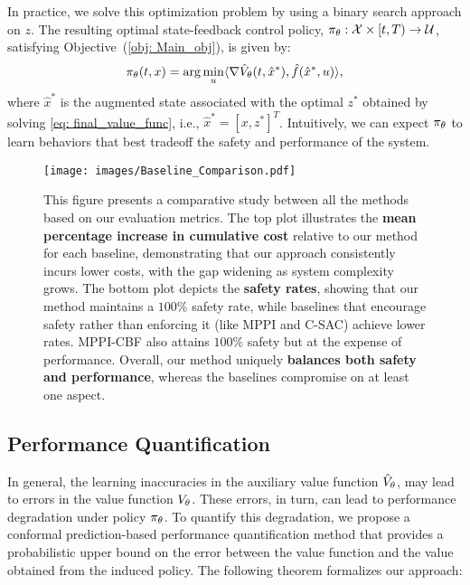 In practice, we solve this optimization problem by using a binary search approach on $z$. The resulting optimal state-feedback control policy, $\pi_{\theta}: \mathcal{X} \times [t, T) \to \mathcal{U}$, satisfying Objective~(\ref{obj: Main_obj}), is given by:
\begin{equation} \label{eq: optimal_pi}
    \pi_{\theta}(t, x) = \arg \min _u \langle\nabla \hat{V}_{\theta}(t, \hat{x}^*), \hat{f}(\hat{x}^*, u)\rangle,
\end{equation}
where $\hat{x}^*$ is the augmented state associated with the optimal $z^*$ obtained by solving \eqref{eq: final_value_func}, i.e., $\hat{x}^* = [x, z^*]^T$.
Intuitively, we can expect $\pi_{\theta}$ to learn behaviors that best tradeoff the safety and performance of the system.
\begin{figure*}[t]
    \centering
    \texttt{[image: images/Baseline\_Comparison.pdf]}
    \vspace{-0.5em}
\caption{This figure presents a comparative study between all the methods based on our evaluation metrics. The top plot illustrates the \textbf{mean percentage increase in cumulative cost} relative to our method for each baseline, demonstrating that our approach consistently incurs lower costs, with the gap widening as system complexity grows. The bottom plot depicts the \textbf{safety rates}, showing that our method maintains a $100\%$ safety rate, while baselines that encourage safety rather than enforcing it (like MPPI and C-SAC) achieve lower rates. MPPI-CBF also attains $100\%$ safety but at the expense of performance. Overall, our method uniquely \textbf{balances both safety and performance}, whereas the baselines compromise on at least one aspect.} 
\label{fig: baseline_comparison}
\vspace{-0.8em}
\end{figure*}
\vspace{-0.8em}
\subsection{Performance Quantification}

In general, the learning inaccuracies in the auxiliary value function $\hat{V}_{\theta}$, may lead to errors in the value function $V_{\theta}$.
These errors, in turn, can lead to performance degradation under policy $\pi_{\theta}$.
To quantify this degradation, we propose a conformal prediction-based performance quantification method that provides a probabilistic upper bound on the error between the value function and the value obtained from the induced policy. The following theorem formalizes our approach:

